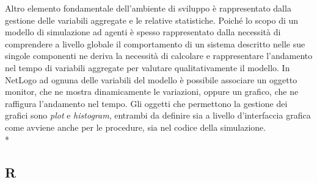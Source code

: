 \documentclass[12pt,a4paper,openright,twoside]{report}
\begin{document}
Altro elemento fondamentale dell'ambiente di sviluppo è rappresentato dalla gestione delle variabili aggregate e le relative statistiche. Poiché lo scopo di un modello di simulazione ad agenti è spesso rappresentato dalla necessità di comprendere a livello globale il comportamento di un sistema descritto nelle sue singole componenti ne deriva la necessità di calcolare e rappresentare l'andamento nel tempo di variabili aggregate per valutare qualitativamente il modello. In NetLogo ad ognuna delle variabili del modello è possibile associare un oggetto monitor, che ne mostra dinamicamente le variazioni, oppure un grafico, che ne raffigura l'andamento nel tempo. Gli  oggetti che permettono la gestione dei grafici sono \emph{plot} e \emph{histogram}, entrambi da definire sia a livello d'interfaccia grafica come avviene anche per le procedure, sia nel codice della simulazione.\\* 


\subsection{R}
\end{document}
